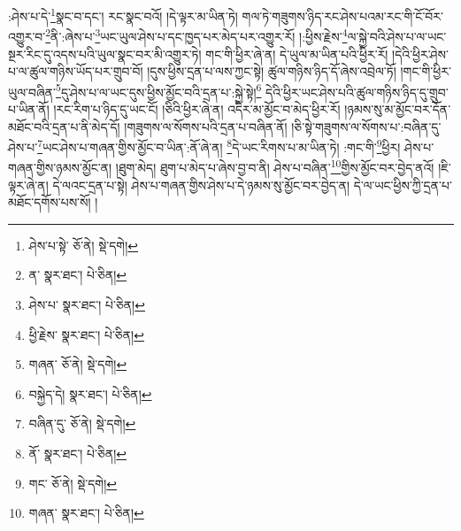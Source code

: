 :ཤེས་པ་དེ་\footnote{ཤེས་པ་སྟེ་  ཅོ་ནེ།  སྡེ་དགེ། }སྣང་བ་དང་། རང་སྣང་བའོ། །དེ་ལྟར་མ་ཡིན་ཏེ། གལ་ཏེ་གཟུགས་ཉིད་རང་ཤེས་པའམ་རང་གི་ངོ་བོར་འགྱུར་བ་\footnote{ན་  སྣར་ཐང་།  པེ་ཅིན། }ནི་:ཞེས་པ་\footnote{ཤེས་པ་  སྣར་ཐང་།  པེ་ཅིན། }ཡང་ཡུལ་ཤེས་པ་དང་ཁྱད་པར་མེད་པར་འགྱུར་རོ། །:ཕྱིས་རྗེས་\footnote{ཕྱི་རྗེས་  སྣར་ཐང་།  པེ་ཅིན། }ལ་སྐྱེ་བའི་ཤེས་པ་ལ་ཡང་སྔར་རིང་དུ་འདས་པའི་ཡུལ་སྣང་བར་མི་འགྱུར་ཏེ། གང་གི་ཕྱིར་ཞེ་ན། དེ་ཡུལ་མ་ཡིན་པའི་ཕྱིར་རོ། །དེའི་ཕྱིར་ཤེས་པ་ལ་ཚུལ་གཉིས་ཡོད་པར་གྲུབ་བོ། །དུས་ཕྱིས་དྲན་པ་ལས་ཀྱང་སྟེ། ཚུལ་གཉིས་ཉིད་དོ་ཞེས་འབྲེལ་ཏོ། །གང་གི་ཕྱིར་ཡུལ་བཞིན་\footnote{གཞན་  ཅོ་ནེ།  སྡེ་དགེ། }དུ་ཤེས་པ་ལ་ཡང་དུས་ཕྱིས་མྱོང་བའི་དྲན་པ་:སྐྱེ་སྟེ།\footnote{བསྐྱེད་དེ།  སྣར་ཐང་།  པེ་ཅིན། } དེའི་ཕྱིར་ཡང་ཤེས་པའི་ཚུལ་གཉིས་ཉིད་དུ་གྲུབ་པ་ཡིན་ནོ། །རང་རིག་པ་ཉིད་དུ་ཡང་ངོ། །ཅིའི་ཕྱིར་ཞེ་ན། འདིར་མ་མྱོང་བ་མེད་ཕྱིར་རོ། །ཉམས་སུ་མ་མྱོང་བར་དོན་མཐོང་བའི་དྲན་པ་ནི་མེད་དོ། །གཟུགས་ལ་སོགས་པའི་དྲན་པ་བཞིན་ནོ། །ཅི་སྟེ་གཟུགས་ལ་སོགས་པ་:བཞིན་དུ་ཤེས་པ་\footnote{བཞིན་དུ་  ཅོ་ནེ།  སྡེ་དགེ། }ཡང་ཤེས་པ་གཞན་གྱིས་མྱོང་བ་ཡིན་:ནོ་ཞེ་ན། \footnote{ནོ་  སྣར་ཐང་།  པེ་ཅིན། }དེ་ཡང་རིགས་པ་མ་ཡིན་ཏེ། :གང་གི་\footnote{གང་  ཅོ་ནེ།  སྡེ་དགེ། }ཕྱིར། ཤེས་པ་གཞན་གྱིས་ཉམས་མྱོང་ན། །ཐུག་མེད། ཐུག་པ་མེད་པ་ཞེས་བྱ་བ་ནི། ཤེས་པ་བཞིན་\footnote{གཞན་  སྣར་ཐང་།  པེ་ཅིན། }གྱིས་མྱོང་བར་བྱེད་ནའོ། །ཇི་ལྟར་ཞེ་ན། དེ་ལའང་དྲན་པ་སྟེ། ཤེས་པ་གཞན་གྱིས་ཤེས་པ་དེ་ཉམས་སུ་མྱོང་བར་བྱེད་ན། དེ་ལ་ཡང་ཕྱིས་ཀྱི་དྲན་པ་མཐོང་དགོས་པས་སོ། །
